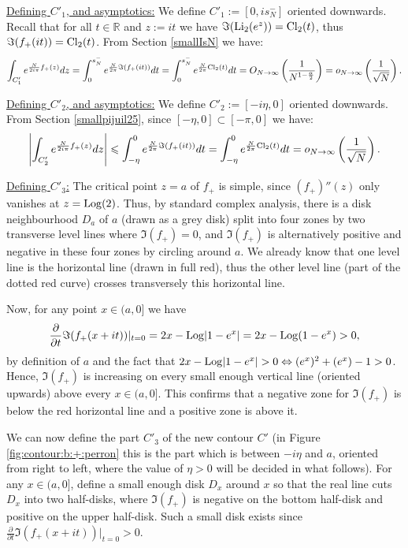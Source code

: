 \documentclass[11pt]{amsart}
\newcommand{\R}{\mathbb{R}}
\newcommand{\Log}{{\rm Log}}
\begin{document}
{\underline{Defining $C'_1$, and asymptotics:} We define $C'_1:=[0,i s_N^-]$ oriented downwards. Recall that for all $t\in \R$ and $z:=it$ we have $\Im({\rm Li}_2(e^z))={\rm Cl}_2(t)$, thus $\Im(f_+(it))={\rm Cl}_2(t)$. From Section \ref{smallIsN} we have:
$$ \int_{C'_1} e^{\frac{N}{2 i \pi}f_+(z)}dz =
\int_{0}^{s_N^-} e^{\frac{N}{2 \pi}\Im(f_+(it))}dt=
\int_{0}^{s_N^-}e^{\frac{N}{2 \pi}{\rm Cl}_2(t)}dt = O_{N\to \infty}\left (\frac{1}{N^{1-\frac{\alpha}{2}}}\right ) = o_{N\to \infty}\left (\frac{1}{\sqrt{N}}\right ).$$

\underline{Defining $C'_2$, and asymptotics:} We define $C'_2:=[-i\eta,0]$ oriented downwards. From Section \ref{smallpijuil25}, since $[-\eta,0] \subset [-\pi,0]$ we have:
$$ \left |\int_{C'_2} e^{\frac{N}{2 i \pi}f_+(z)}dz\right | \leqslant
\int_{-\eta}^{0} e^{\frac{N}{2 \pi}\Im(f_+(it))}dt=
\int_{-\eta}^{0}e^{\frac{N}{2 \pi}{\rm Cl}_2(t)}dt = o_{N\to \infty}\left (\frac{1}{\sqrt{N}}\right ).$$

\underline{Defining $C'_3$:}
The critical point $z=a$ of $f_+$ is simple, since $(f_+)''(z)$ only vanishes at $z=\Log(2)$. Thus, by standard complex analysis, there is a disk neighbourhood $D_a$ of $a$ (drawn as a grey disk) split into four zones by two transverse level lines where $\Im(f_+)=0$, and $\Im(f_+)$ is alternatively positive and negative in these four zones by circling around $a$. We already know that one level line is the horizontal line (drawn in full red), thus the other level line (part of the dotted red curve) crosses transversely this horizontal line.

Now, for any point $x \in (a,0]$ we have
$$\dfrac{\partial}{\partial t} \Im (f_+(x+it))\vert_{t=0} =  2x - \Log \vert 1-e^{x} \vert
=  2x - \Log (1-e^{x} )>0,$$
by definition of $a$ and the fact that
$ 2x - \Log \vert 1-e^{x} \vert>0 \Leftrightarrow (e^x)^2+(e^x)-1>0$.
Hence, $\Im(f_+)$ is increasing on every small enough vertical line (oriented upwards) above every $x\in(a,0]$. This confirms that a negative zone for $\Im(f_+)$ is below the red horizontal line and a positive zone is above it.

We can now define the part $C'_3$ of the new contour $C'$ (in Figure \ref{fig:contour:b:+:perron} this is the part which is between $-i\eta$ and $a$, oriented from right to left, where the value of $\eta>0$ will be decided in what follows). For any $x \in (a,0]$, define a small enough disk $D_x$ around $x$ so that the real line cuts $D_x$ into two half-disks, where $\Im(f_+)$ is negative on the bottom half-disk and positive on the upper half-disk. Such a small disk exists since $\textstyle \frac{\partial}{\partial t} \Im (f_+(x+it))\vert_{t=0}>0$.

}
\end{document}

